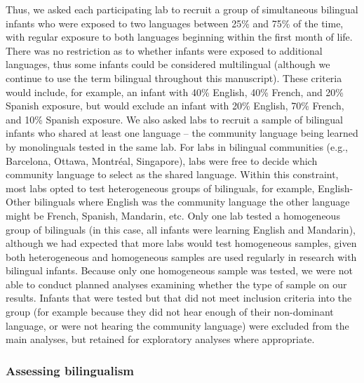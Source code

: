 \documentclass[english,,man,floatsintext]{apa6}
\begin{document}
Thus, we asked each participating lab to recruit a group of simultaneous bilingual infants who were exposed to two languages between 25\% and 75\% of the time, with regular exposure to both languages beginning within the first month of life. There was no restriction as to whether infants were exposed to additional languages, thus some infants could be considered multilingual (although we continue to use the term bilingual throughout this manuscript). These criteria would include, for example, an infant with 40\% English, 40\% French, and 20\% Spanish exposure, but would exclude an infant with 20\% English, 70\% French, and 10\% Spanish exposure. We also asked labs to recruit a sample of bilingual infants who shared at least one language -- the community language being learned by monolinguals tested in the same lab. For labs in bilingual communities (e.g., Barcelona, Ottawa, Montréal, Singapore), labs were free to decide which community language to select as the shared language. Within this constraint, most labs opted to test heterogeneous groups of bilinguals, for example, English-Other bilinguals where English was the community language the other language might be French, Spanish, Mandarin, etc. Only one lab tested a homogeneous group of bilinguals (in this case, all infants were learning English and Mandarin), although we had expected that more labs would test homogeneous samples, given both heterogeneous and homogeneous samples are used regularly in research with bilingual infants. Because only one homogeneous sample was tested, we were not able to conduct planned analyses examining whether the type of sample on our results. Infants that were tested but that did not meet inclusion criteria into the group (for example because they did not hear enough of their non-dominant language, or were not hearing the community language) were excluded from the main analyses, but retained for exploratory analyses where appropriate.

\hypertarget{assessing-bilingualism}{%
\subsubsection{Assessing bilingualism}\label{assessing-bilingualism}}
\end{document}
